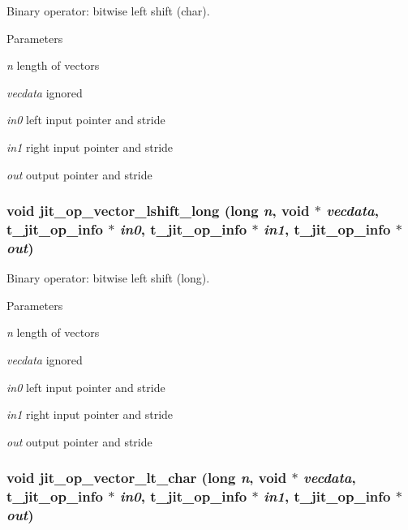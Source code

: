 Binary operator: bitwise left shift (char). 
\begin{DoxyParams}{Parameters}
\item[{\em n}]length of vectors \item[{\em vecdata}]ignored \item[{\em in0}]left input pointer and stride \item[{\em in1}]right input pointer and stride \item[{\em out}]output pointer and stride \end{DoxyParams}
\hypertarget{group__opvecmod_ga086051a9de64af7a3e788d496b720faa}{
\subsubsection[{jit\_\-op\_\-vector\_\-lshift\_\-long}]{\setlength{\rightskip}{0pt plus 5cm}void jit\_\-op\_\-vector\_\-lshift\_\-long (long {\em n}, \/  void $\ast$ {\em vecdata}, \/  {\bf t\_\-jit\_\-op\_\-info} $\ast$ {\em in0}, \/  {\bf t\_\-jit\_\-op\_\-info} $\ast$ {\em in1}, \/  {\bf t\_\-jit\_\-op\_\-info} $\ast$ {\em out})}}
\label{group__opvecmod_ga086051a9de64af7a3e788d496b720faa}


Binary operator: bitwise left shift (long). 
\begin{DoxyParams}{Parameters}
\item[{\em n}]length of vectors \item[{\em vecdata}]ignored \item[{\em in0}]left input pointer and stride \item[{\em in1}]right input pointer and stride \item[{\em out}]output pointer and stride \end{DoxyParams}
\hypertarget{group__opvecmod_ga5d0dbfe0061f261edeaa94fad0016e2f}{
\subsubsection[{jit\_\-op\_\-vector\_\-lt\_\-char}]{\setlength{\rightskip}{0pt plus 5cm}void jit\_\-op\_\-vector\_\-lt\_\-char (long {\em n}, \/  void $\ast$ {\em vecdata}, \/  {\bf t\_\-jit\_\-op\_\-info} $\ast$ {\em in0}, \/  {\bf t\_\-jit\_\-op\_\-info} $\ast$ {\em in1}, \/  {\bf t\_\-jit\_\-op\_\-info} $\ast$ {\em out})}}
\label{group__opvecmod_ga5d0dbfe0061f261edeaa94fad0016e2f}


